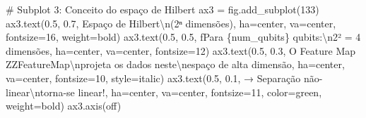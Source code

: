 \documentclass[
  brazilian,
]{report}
\newenvironment{Shaded}{\begin{snugshade}}{\end{snugshade}}
\newcommand{\CharTok}[1]{\textcolor[rgb]{0.13,0.47,0.30}{#1}}
\newcommand{\CommentTok}[1]{\textcolor[rgb]{0.37,0.37,0.37}{#1}}
\newcommand{\DecValTok}[1]{\textcolor[rgb]{0.68,0.00,0.00}{#1}}
\newcommand{\FloatTok}[1]{\textcolor[rgb]{0.68,0.00,0.00}{#1}}
\newcommand{\NormalTok}[1]{\textcolor[rgb]{0.00,0.23,0.31}{#1}}
\newcommand{\OperatorTok}[1]{\textcolor[rgb]{0.37,0.37,0.37}{#1}}
\newcommand{\SpecialCharTok}[1]{\textcolor[rgb]{0.37,0.37,0.37}{#1}}
\newcommand{\SpecialStringTok}[1]{\textcolor[rgb]{0.13,0.47,0.30}{#1}}
\newcommand{\StringTok}[1]{\textcolor[rgb]{0.13,0.47,0.30}{#1}}
\begin{document}
\begin{tcolorbox}
\begin{Shaded}
\begin{Highlighting}[]
\CommentTok{\# Subplot 3: Conceito do espaço de Hilbert}
\NormalTok{ax3 }\OperatorTok{=}\NormalTok{ fig.add\_subplot(}\DecValTok{133}\NormalTok{)}
\NormalTok{ax3.text(}\FloatTok{0.5}\NormalTok{, }\FloatTok{0.7}\NormalTok{, }\StringTok{\textquotesingle{}Espaço de Hilbert}\CharTok{\textbackslash{}n}\StringTok{(2ⁿ dimensões)\textquotesingle{}}\NormalTok{, }
\NormalTok{         ha}\OperatorTok{=}\StringTok{\textquotesingle{}center\textquotesingle{}}\NormalTok{, va}\OperatorTok{=}\StringTok{\textquotesingle{}center\textquotesingle{}}\NormalTok{, fontsize}\OperatorTok{=}\DecValTok{16}\NormalTok{, weight}\OperatorTok{=}\StringTok{\textquotesingle{}bold\textquotesingle{}}\NormalTok{)}
\NormalTok{ax3.text(}\FloatTok{0.5}\NormalTok{, }\FloatTok{0.5}\NormalTok{, }\SpecialStringTok{f\textquotesingle{}Para }\SpecialCharTok{\{}\NormalTok{num\_qubits}\SpecialCharTok{\}}\SpecialStringTok{ qubits:}\CharTok{\textbackslash{}n}\SpecialStringTok{2² = 4 dimensões\textquotesingle{}}\NormalTok{, }
\NormalTok{         ha}\OperatorTok{=}\StringTok{\textquotesingle{}center\textquotesingle{}}\NormalTok{, va}\OperatorTok{=}\StringTok{\textquotesingle{}center\textquotesingle{}}\NormalTok{, fontsize}\OperatorTok{=}\DecValTok{12}\NormalTok{)}
\NormalTok{ax3.text(}\FloatTok{0.5}\NormalTok{, }\FloatTok{0.3}\NormalTok{, }\StringTok{\textquotesingle{}O Feature Map ZZFeatureMap}\CharTok{\textbackslash{}n}\StringTok{projeta os dados neste}\CharTok{\textbackslash{}n}\StringTok{espaço de alta dimensão\textquotesingle{}}\NormalTok{, }
\NormalTok{         ha}\OperatorTok{=}\StringTok{\textquotesingle{}center\textquotesingle{}}\NormalTok{, va}\OperatorTok{=}\StringTok{\textquotesingle{}center\textquotesingle{}}\NormalTok{, fontsize}\OperatorTok{=}\DecValTok{10}\NormalTok{, style}\OperatorTok{=}\StringTok{\textquotesingle{}italic\textquotesingle{}}\NormalTok{)}
\NormalTok{ax3.text(}\FloatTok{0.5}\NormalTok{, }\FloatTok{0.1}\NormalTok{, }\StringTok{\textquotesingle{}→ Separação não{-}linear}\CharTok{\textbackslash{}n}\StringTok{torna{-}se linear!\textquotesingle{}}\NormalTok{, }
\NormalTok{         ha}\OperatorTok{=}\StringTok{\textquotesingle{}center\textquotesingle{}}\NormalTok{, va}\OperatorTok{=}\StringTok{\textquotesingle{}center\textquotesingle{}}\NormalTok{, fontsize}\OperatorTok{=}\DecValTok{11}\NormalTok{, color}\OperatorTok{=}\StringTok{\textquotesingle{}green\textquotesingle{}}\NormalTok{, weight}\OperatorTok{=}\StringTok{\textquotesingle{}bold\textquotesingle{}}\NormalTok{)}
\NormalTok{ax3.axis(}\StringTok{\textquotesingle{}off\textquotesingle{}}\NormalTok{)}


\end{Highlighting}
\end{Shaded}
\end{tcolorbox}
\end{document}
